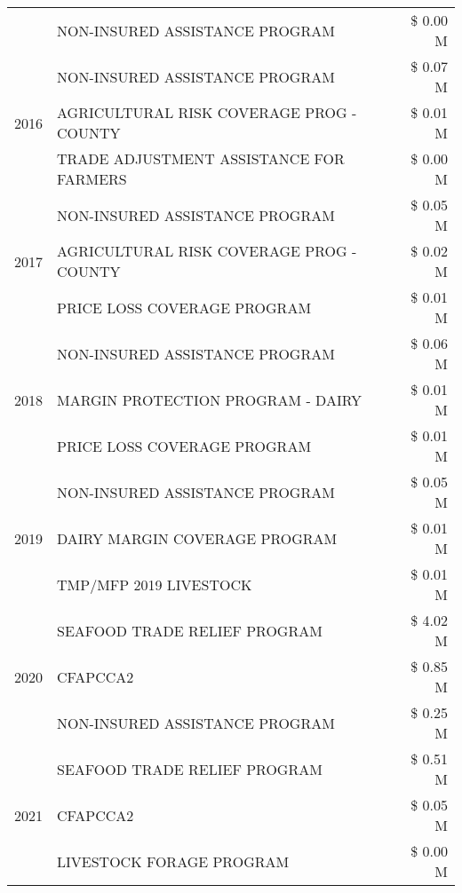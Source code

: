 \begin{tabular}{llr}
 & NON-INSURED ASSISTANCE PROGRAM & \$ 0.00 M \\
\cline{1-3}
\multirow[t]{3}{*}{2016} & NON-INSURED ASSISTANCE PROGRAM & \$ 0.07 M \\
 & AGRICULTURAL RISK COVERAGE PROG - COUNTY & \$ 0.01 M \\
 & TRADE ADJUSTMENT ASSISTANCE FOR FARMERS & \$ 0.00 M \\
\cline{1-3}
\multirow[t]{3}{*}{2017} & NON-INSURED ASSISTANCE PROGRAM & \$ 0.05 M \\
 & AGRICULTURAL RISK COVERAGE PROG - COUNTY & \$ 0.02 M \\
 & PRICE LOSS COVERAGE PROGRAM & \$ 0.01 M \\
\cline{1-3}
\multirow[t]{3}{*}{2018} & NON-INSURED ASSISTANCE PROGRAM & \$ 0.06 M \\
 & MARGIN PROTECTION PROGRAM - DAIRY & \$ 0.01 M \\
 & PRICE LOSS COVERAGE PROGRAM & \$ 0.01 M \\
\cline{1-3}
\multirow[t]{3}{*}{2019} & NON-INSURED ASSISTANCE PROGRAM & \$ 0.05 M \\
 & DAIRY MARGIN COVERAGE PROGRAM & \$ 0.01 M \\
 & TMP/MFP 2019 LIVESTOCK & \$ 0.01 M \\
\cline{1-3}
\multirow[t]{3}{*}{2020} & SEAFOOD TRADE RELIEF PROGRAM & \$ 4.02 M \\
 & CFAPCCA2 & \$ 0.85 M \\
 & NON-INSURED ASSISTANCE PROGRAM & \$ 0.25 M \\
\cline{1-3}
\multirow[t]{3}{*}{2021} & SEAFOOD TRADE RELIEF PROGRAM & \$ 0.51 M \\
 & CFAPCCA2 & \$ 0.05 M \\
 & LIVESTOCK FORAGE PROGRAM & \$ 0.00 M \\
\cline{1-3}
\bottomrule
\end{tabular}
